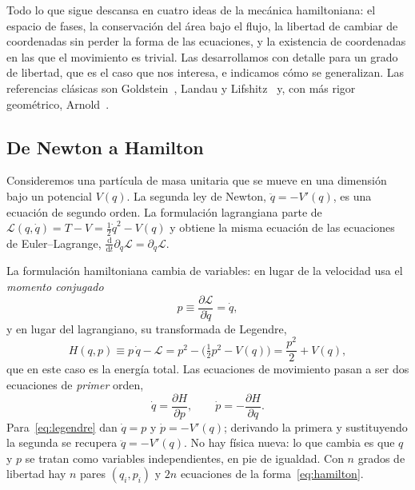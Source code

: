 \documentclass[11pt,a4paper]{article}
\newcommand{\dd}{\mathrm{d}}
\theoremstyle{definition}
\begin{document}
Todo lo que sigue descansa en cuatro ideas de la mecánica hamiltoniana: el espacio de
fases, la conservación del área bajo el flujo, la libertad de cambiar de coordenadas
sin perder la forma de las ecuaciones, y la existencia de coordenadas en las que el
movimiento es trivial. Las desarrollamos con detalle para un grado de libertad, que
es el caso que nos interesa, e indicamos cómo se generalizan. Las referencias
clásicas son Goldstein~\cite[caps.~8--10]{goldstein2002}, Landau y
Lifshitz~\cite[\S\S40--52]{landau1976} y, con más rigor geométrico,
Arnold~\cite[caps.~8--10]{arnold1989}.

\subsection{De Newton a Hamilton}

Consideremos una partícula de masa unitaria que se mueve en una dimensión bajo un
potencial $V(q)$. La segunda ley de Newton, $\ddot q=-V'(q)$, es una ecuación de
segundo orden. La formulación lagrangiana parte de $\mathcal{L}(q,\dot q)=T-V=
\tfrac12\dot q^2-V(q)$ y obtiene la misma ecuación de las ecuaciones de
Euler--Lagrange, $\frac{\dd}{\dd t}\partial_{\dot q}\mathcal{L}=\partial_q\mathcal{L}$.

La formulación hamiltoniana cambia de variables: en lugar de la velocidad usa el
\emph{momento conjugado}
\begin{equation}
  p \equiv \frac{\partial\mathcal{L}}{\partial\dot q} = \dot q ,
\end{equation}
y en lugar del lagrangiano, su transformada de Legendre,
\begin{equation}
  H(q,p) \equiv p\,\dot q - \mathcal{L}
  = p^2 - \Big(\tfrac12 p^2 - V(q)\Big)
  = \frac{p^2}{2} + V(q) ,
  \label{eq:legendre}
\end{equation}
que en este caso es la energía total. Las ecuaciones de movimiento pasan a ser dos
ecuaciones de \emph{primer} orden,
\begin{equation}
  \dot q = \frac{\partial H}{\partial p}, \qquad
  \dot p = -\frac{\partial H}{\partial q} .
  \label{eq:hamilton}
\end{equation}
Para~\eqref{eq:legendre} dan $\dot q=p$ y $\dot p=-V'(q)$; derivando la primera y
sustituyendo la segunda se recupera $\ddot q=-V'(q)$. No hay física nueva: lo que
cambia es que $q$ y $p$ se tratan como variables independientes, en pie de igualdad.
Con $n$ grados de libertad hay $n$ pares $(q_i,p_i)$ y $2n$ ecuaciones de la
forma~\eqref{eq:hamilton}.
\end{document}
